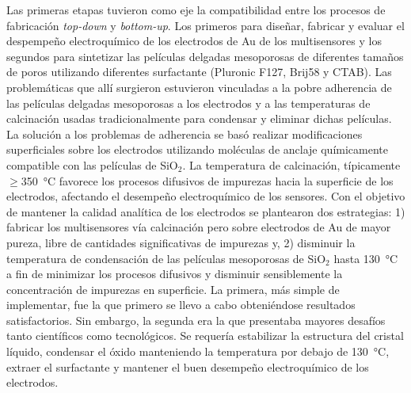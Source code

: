  Las primeras etapas tuvieron como eje la compatibilidad entre los procesos de fabricación \textit{top-down} y \textit{bottom-up}. Los primeros para diseñar, fabricar y evaluar el despempeño electroquímico de los electrodos de Au de los multisensores y los segundos para sintetizar las películas delgadas mesoporosas de diferentes tamaños de poros utilizando diferentes surfactante (Pluronic F127, Brij58 y CTAB). Las problemáticas que allí surgieron estuvieron vinculadas a la pobre adherencia de las películas delgadas mesoporosas a los electrodos y a las temperaturas de calcinación usadas tradicionalmente para condensar y eliminar dichas películas. La solución a los problemas de adherencia se basó realizar modificaciones superficiales sobre los electrodos utilizando moléculas de anclaje químicamente compatible con las películas de SiO$_2$. La temperatura de calcinación, típicamente $\geq$\SI{350}{\celsius} favorece los procesos difusivos de impurezas hacia la superficie de los electrodos, afectando el desempeño electroquímico de los sensores. Con el objetivo de mantener la calidad analítica de los electrodos se plantearon dos estrategias: 1) fabricar los multisensores vía calcinación pero sobre electrodos de Au de mayor pureza, libre de cantidades significativas de impurezas y, 2) disminuir la temperatura de condensación de las películas mesoporosas de SiO$_2$ hasta \SI{130}{\celsius} a fin de minimizar los procesos difusivos y disminuir sensiblemente la concentración de impurezas en superficie. La primera, más simple de implementar, fue la que primero se llevo a cabo obteniéndose resultados satisfactorios. Sin embargo, la segunda era la que presentaba mayores desafíos tanto científicos como tecnológicos. Se requería estabilizar la estructura del cristal líquido, condensar el óxido manteniendo la temperatura por debajo de \SI{130}{\celsius}, extraer el surfactante y mantener el buen desempeño electroquímico de los electrodos.  

